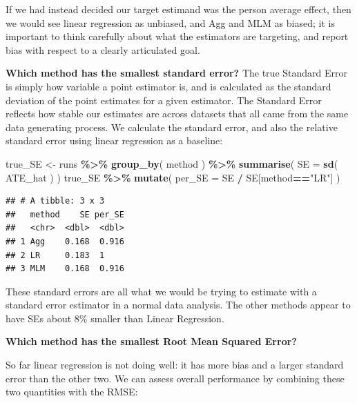 \documentclass[
]{book}
\newenvironment{Shaded}{\begin{snugshade}}{\end{snugshade}}
\newcommand{\AttributeTok}[1]{\textcolor[rgb]{0.13,0.29,0.53}{#1}}
\newcommand{\FunctionTok}[1]{\textcolor[rgb]{0.13,0.29,0.53}{\textbf{#1}}}
\newcommand{\NormalTok}[1]{#1}
\newcommand{\OtherTok}[1]{\textcolor[rgb]{0.56,0.35,0.01}{#1}}
\newcommand{\SpecialCharTok}[1]{\textcolor[rgb]{0.81,0.36,0.00}{\textbf{#1}}}
\newcommand{\StringTok}[1]{\textcolor[rgb]{0.31,0.60,0.02}{#1}}
\begin{document}
If we had instead decided our target estimand was the person average effect, then we would see linear regression as unbiased, and Agg and MLM as biased; it is important to think carefully about what the estimators are targeting, and report bias with respect to a clearly articulated goal.

\textbf{Which method has the smallest standard error?}
The true Standard Error is simply how variable a point estimator is, and is calculated as the standard deviation of the point estimates for a given estimator.
The Standard Error reflects how stable our estimates are across datasets that all came from the same data generating process.
We calculate the standard error, and also the relative standard error using linear regression as a baseline:

\begin{Shaded}
\begin{Highlighting}[]
\NormalTok{true\_SE }\OtherTok{\textless{}{-}}\NormalTok{ runs }\SpecialCharTok{\%\textgreater{}\%} 
  \FunctionTok{group\_by}\NormalTok{( method ) }\SpecialCharTok{\%\textgreater{}\%}
  \FunctionTok{summarise}\NormalTok{( }
    \AttributeTok{SE =} \FunctionTok{sd}\NormalTok{( ATE\_hat )}
\NormalTok{  )}
\NormalTok{true\_SE }\SpecialCharTok{\%\textgreater{}\%}
  \FunctionTok{mutate}\NormalTok{( }\AttributeTok{per\_SE =}\NormalTok{ SE }\SpecialCharTok{/}\NormalTok{ SE[method}\SpecialCharTok{==}\StringTok{"LR"}\NormalTok{] )}
\end{Highlighting}
\end{Shaded}

\begin{verbatim}
## # A tibble: 3 x 3
##   method    SE per_SE
##   <chr>  <dbl>  <dbl>
## 1 Agg    0.168  0.916
## 2 LR     0.183  1    
## 3 MLM    0.168  0.916
\end{verbatim}

These standard errors are all what we would be trying to estimate with a standard error estimator in a normal data analysis.
The other methods appear to have SEs about 8\% smaller than Linear Regression.

\textbf{Which method has the smallest Root Mean Squared Error?}

So far linear regression is not doing well: it has more bias and a larger standard error than the other two.
We can assess overall performance by combining these two quantities with the RMSE:
\end{document}

